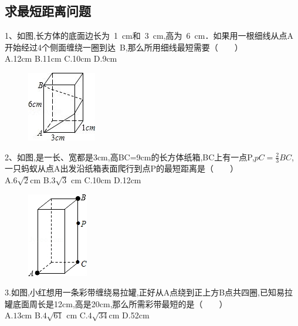 \documentclass[14pt,UTF-8,a4paper,titlepage]{ctexbook}
\begin{document}
\subsection{求最短距离问题}
1、如图,长方体的底面边长为~1~cm和~3~cm,高为~6~cm．如果用一根细线从点A开始经过4个侧面缠绕一圈到达~B,那么所用细线最短需要（　　）\\
A.12cm \hfill B.11cm \hfill  C.10cm  \hfill  D.9cm \par  
\begin{figure}[h]
\includegraphics[scale=1]{6.jpg}
\end{figure}
2、如图,是一长、宽都是3cm,高BC=9cm的长方体纸箱,BC上有一点P,$pC=\frac{2}{3}BC$,一只蚂蚁从点A出发沿纸箱表面爬行到点P的最短距离是（　　）\\
A.$6\sqrt{2}$cm \hfill B.$3\sqrt{3}$ cm \hfill  C.10cm \hfill  D.12cm \par
\begin{figure}[h]
\includegraphics[scale=1]{7.jpg}
\end{figure}
3.如图,小红想用一条彩带缠绕易拉罐,正好从A点绕到正上方B点共四圈,已知易拉罐底面周长是12cm,高是20cm,那么所需彩带最短的是（　　）\\
A.$13$cm \hfill B.$4\sqrt{61}$ cm \hfill  C.$4\sqrt{34}$cm \hfill  D.52cm \par 
\vspace{0.2cm}
\end{document}

